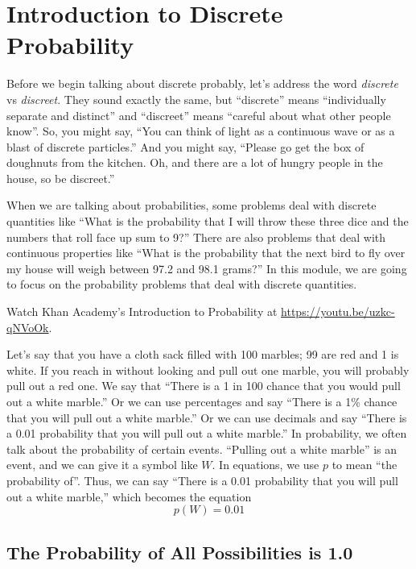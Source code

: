 \chapter{Introduction to Discrete Probability}

Before we begin talking about discrete probably, let's address the word \emph{discrete} vs \emph{discreet}.
They sound exactly the same, but ``discrete'' means ``individually
separate and distinct'' and ``discreet'' means ``careful about what
other people know''.  So, you might say, ``You can think of light as a
continuous wave or as a blast of discrete particles.'' And you might
say, ``Please go get the box of doughnuts from the kitchen. Oh, and
there are a lot of hungry people in the house, so be
discreet.''

When we are talking about probabilities, some problems deal
with discrete quantities like ``What is the probability that I will
throw these three dice and the numbers that roll face up sum to 9?'' There
are also problems that deal with continuous properties like ``What is
the probability that the next bird to fly over my house will weigh
between 97.2 and 98.1 grams?'' In this module, we are going to focus
on the probability problems that deal with discrete quantities.

Watch Khan Academy's Introduction to Probability at \url{https://youtu.be/uzkc-qNVoOk}.

Let's say that you have a cloth sack filled with 100 marbles; 99 are red
and 1 is white. If you reach in without looking and pull out
one marble, you will probably pull out a red one. We say that ``There
is a 1 in 100 chance that you would pull out a white marble.'' Or we
can use percentages and say ``There is a 1\% chance that you will pull
out a white marble.'' Or we can use decimals and say ``There is a 0.01
probability that you will pull out a white marble.''
In probability, we often talk about the probability of certain
events. ``Pulling out a white marble'' is an event, and we can give it
a symbol like $W$. In equations, we use $p$ to mean ``the
probability of''.  Thus, we can say ``There is a 0.01 probability that
you will pull out a white marble,'' which becomes the equation
\begin{equation*}
  p(W) = 0.01
\end{equation*}

\section{The Probability of All Possibilities is 1.0}

